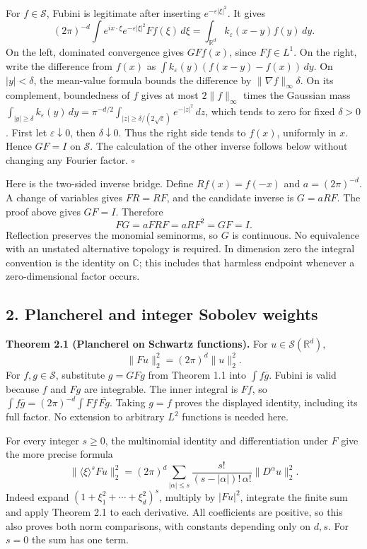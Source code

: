 \documentclass[
  11pt,
]{article}
\begin{document}
For \(f\in\mathcal S\), Fubini is legitimate after inserting
\(e^{-\varepsilon|\xi|^2}\). It gives \[
(2\pi)^{-d}\int e^{ix\cdot\xi}e^{-\varepsilon|\xi|^2}Ff(\xi)\,d\xi
=\int_{\mathbb R^d}k_\varepsilon(x-y)f(y)\,dy.
\] On the left, dominated convergence gives \(GFf(x)\), since
\(Ff\in L^1\). On the right, write the difference from \(f(x)\) as
\(\int k_\varepsilon(y)(f(x-y)-f(x))\,dy\). On \(|y|<\delta\), the
mean-value formula bounds the difference by
\(\|\nabla f\|_\infty\delta\). On its complement, boundedness of \(f\)
gives at most \(2\|f\|_\infty\) times the Gaussian mass
\(\int_{|y|\geq\delta}k_\varepsilon(y)\,dy=\pi^{-d/2}\int_{|z|\geq\delta/(2\sqrt{\varepsilon})}e^{-|z|^2}\,dz\),
which tends to zero for fixed \(\delta>0\). First let
\(\varepsilon\downarrow0\), then \(\delta\downarrow0\). Thus the right
side tends to \(f(x)\), uniformly in \(x\). Hence \(GF=I\) on
\(\mathcal S\). The calculation of the other inverse follows below
without changing any Fourier factor. \(\square\)

Here is the two-sided inverse bridge. Define \(Rf(x)=f(-x)\) and
\(a=(2\pi)^{-d}\). A change of variables gives \(FR=RF\), and the
candidate inverse is \(G=aRF\). The proof above gives \(GF=I\).
Therefore \[
FG=aFRF=aRF^2=GF=I.
\] Reflection preserves the monomial seminorms, so \(G\) is continuous.
No equivalence with an unstated alternative topology is required. In
dimension zero the integral convention is the identity on \(\mathbb C\);
this includes that harmless endpoint whenever a zero-dimensional factor
occurs.

\subsection{2. Plancherel and integer Sobolev
weights}\label{plancherel-and-integer-sobolev-weights}

\textbf{Theorem 2.1 (Plancherel on Schwartz functions).} For
\(u\in\mathcal S(\mathbb R^d)\), \[
\|Fu\|_2^2=(2\pi)^d\|u\|_2^2.
\] For \(f,g\in\mathcal S\), substitute \(g=GFg\) from Theorem 1.1 into
\(\int f\overline g\). Fubini is valid because \(f\) and \(Fg\) are
integrable. The inner integral is \(Ff\), so
\(\int f\overline g=(2\pi)^{-d}\int Ff\,\overline{Fg}\). Taking \(g=f\)
proves the displayed identity, including its full factor. No extension
to arbitrary \(L^2\) functions is needed here.

For every integer \(s\geq0\), the multinomial identity and
differentiation under \(F\) give the more precise formula \[
\|\langle\xi\rangle^s Fu\|_2^2
=(2\pi)^d\sum_{|\alpha|\leq s}
\frac{s!}{(s-|\alpha|)!\,\alpha!}\|D^\alpha u\|_2^2.
\] Indeed expand \((1+\xi_1^2+\cdots+\xi_d^2)^s\), multiply by
\(|Fu|^2\), integrate the finite sum and apply Theorem 2.1 to each
derivative. All coefficients are positive, so this also proves both norm
comparisons, with constants depending only on \(d,s\). For \(s=0\) the
sum has one term.
\end{document}
